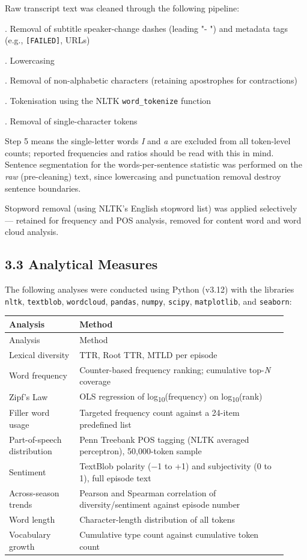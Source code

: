\documentclass[11pt]{article}
\begin{document}
Raw transcript text was cleaned through the following pipeline:

\par{}. Removal of subtitle speaker-change dashes (leading "- ") and metadata tags (e.g., \texttt{[FAILED]}, URLs)
\par{}. Lowercasing
\par{}. Removal of non-alphabetic characters (retaining apostrophes for contractions)
\par{}. Tokenisation using the NLTK \texttt{word\_tokenize} function
\par{}. Removal of single-character tokens

Step 5 means the single-letter words \emph{I} and \emph{a} are excluded from all token-level counts; reported frequencies and ratios should be read with this in mind. Sentence segmentation for the words-per-sentence statistic was performed on the \emph{raw} (pre-cleaning) text, since lowercasing and punctuation removal destroy sentence boundaries.

Stopword removal (using NLTK's English stopword list) was applied selectively --- retained for frequency and POS analysis, removed for content word and word cloud analysis.

\subsection*{3.3 Analytical Measures}

The following analyses were conducted using Python (v3.12) with the libraries \texttt{nltk}, \texttt{textblob}, \texttt{wordcloud}, \texttt{pandas}, \texttt{numpy}, \texttt{scipy}, \texttt{matplotlib}, and \texttt{seaborn}:

\begin{longtable}{p{0.237\linewidth}p{0.683\linewidth}}
\toprule
Analysis & Method \\
\midrule
\endfirsthead
\toprule
Analysis & Method \\
\midrule
\endhead
\bottomrule
\endlastfoot
Lexical diversity & TTR, Root TTR, MTLD per episode \\
Word frequency & Counter-based frequency ranking; cumulative top-\emph{N} coverage \\
Zipf's Law & OLS regression of log\textsubscript{10}(frequency) on log\textsubscript{10}(rank) \\
Filler word usage & Targeted frequency count against a 24-item predefined list \\
Part-of-speech distribution & Penn Treebank POS tagging (NLTK averaged perceptron), 50,000-token sample \\
Sentiment & TextBlob polarity ($-$1 to +1) and subjectivity (0 to 1), full episode text \\
Across-season trends & Pearson and Spearman correlation of diversity/sentiment against episode number \\
Word length & Character-length distribution of all tokens \\
Vocabulary growth & Cumulative type count against cumulative token count \\
\end{longtable}
\end{document}
